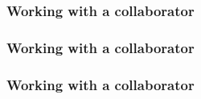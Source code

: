 \documentclass{beamer}
\begin{document}
\begin{frame}
\frametitle{Working with a collaborator}
\begin{center}
\end{center}
\end{frame}


\begin{frame}
\frametitle{Working with a collaborator}
\begin{center}
\end{center}
\end{frame}

\begin{frame}
\frametitle{Working with a collaborator}
\begin{center}
\end{center}
\end{frame}
\end{document}

